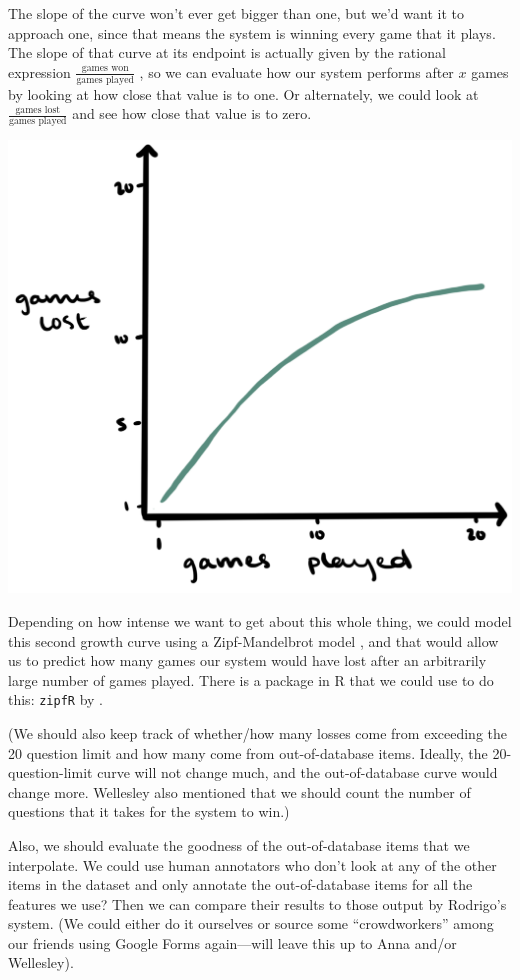\documentclass[a4paper,12pt]{article}
\begin{document}
The slope of the curve won't ever get bigger than one, but we'd want it to approach one, since that means the system is winning every game that it plays.
The slope of that curve at its endpoint is actually given by the rational expression $\frac{\text{games won}}{\text{games played}}$ \citep[50--51]{Baayen2001}, so we can evaluate how our system performs after $x$ games by looking at how close that value is to one.
Or alternately, we could look at $\frac{\text{games lost}}{\text{games played}}$ and see how close that value is to zero.
\begin{center}
	\includegraphics[width=.5\linewidth]{growth-curve2.png}
\end{center}

Depending on how intense we want to get about this whole thing, we could model this second growth curve using a Zipf-Mandelbrot model \citep{Evert2004}, and that would allow us to predict how many games our system would have lost after an arbitrarily large number of games played.
There is a package in R that we could use to do this: \texttt{zipfR} by \citet{BaroniEvert2014}.

(We should also keep track of whether/how many losses come from exceeding the 20 question limit and how many come from out-of-database items. Ideally, the 20-question-limit curve will not change much, and the out-of-database curve would change more.
Wellesley also mentioned that we should count the number of questions that it takes for the system to win.)

Also, we should evaluate the goodness of the out-of-database items that we interpolate.
We could use human annotators who don't look at any of the other items in the dataset and only annotate the out-of-database items for all the features we use? 
Then we can compare their results to those output by Rodrigo's system. 
(We could either do it ourselves or source some ``crowdworkers'' among our friends using Google Forms again---will leave this up to Anna and/or Wellesley).

\pagebreak
\singlespacing
\printbibliography
\end{document}
